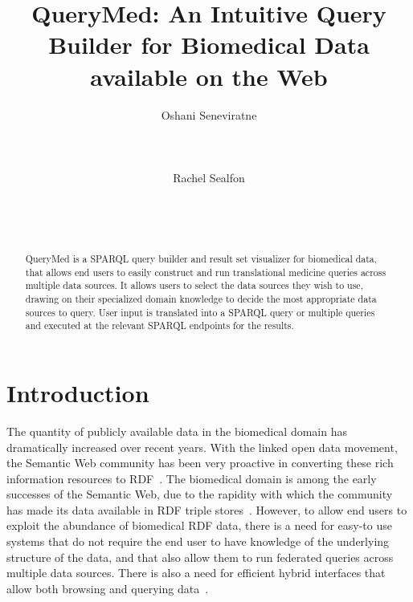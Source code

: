 \documentclass{acm_proc_article-sp}
\begin{document}
\title{QueryMed: An Intuitive Query Builder for Biomedical Data available on the Web}

\author{
\alignauthor Oshani Seneviratne\\
       \\
       \\
       \\
\alignauthor Rachel Sealfon\\
       \\
       \\
       \\
}


\maketitle
\begin{abstract}

QueryMed is a SPARQL query builder and result set visualizer for biomedical data, that allows end users to easily construct and run translational medicine queries across multiple data sources. It allows users to select the data sources they wish to use, drawing on their specialized domain knowledge to decide the most appropriate data sources to query.  User input is translated into a SPARQL query or multiple queries and executed at the relevant SPARQL endpoints for the results.  

\end{abstract}


\section{Introduction}

The quantity of publicly available data in the biomedical domain has dramatically increased over recent years. With the linked open data movement, the Semantic Web community has been very proactive in converting these rich information resources to RDF~\cite{LinkingData}.  The biomedical domain is among the early successes of the Semantic Web, due to the rapidity with which the community has made its data available in RDF triple stores~\cite{Yip}.  However, to allow end users to exploit the abundance of biomedical RDF data, there is a need for easy-to use systems that do not require the end user to have knowledge of the underlying  structure of the data, and that also allow them to run federated queries across multiple data sources.  There is also a  need for efficient hybrid interfaces that allow both browsing and querying data~\cite{Jentzsch}. 
\end{document}
